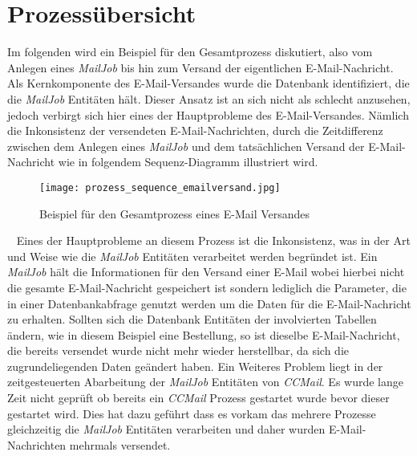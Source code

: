 \section{Prozessübersicht}
Im folgenden wird ein Beispiel für den Gesamtprozess diskutiert, also vom Anlegen eines \emph{MailJob} bis hin zum Versand der eigentlichen E-Mail-Nachricht. Als Kernkomponente des E-Mail-Versandes wurde die Datenbank identifiziert, die die \emph{MailJob} Entitäten hält. Dieser Ansatz ist an sich nicht als schlecht anzusehen, jedoch verbirgt sich hier eines der Hauptprobleme des E-Mail-Versandes. Nämlich die Inkonsistenz der versendeten E-Mail-Nachrichten, durch die Zeitdifferenz zwischen dem Anlegen eines \emph{MailJob} und dem tatsächlichen Versand der E-Mail-Nachricht wie in folgendem Sequenz-Diagramm illustriert wird.
\begin{figure}[h]
\centering
\texttt{[image: prozess\_sequence\_emailversand.jpg]}
\caption{Beispiel für den Gesamtprozess eines E-Mail Versandes}
\label{fig:sequence-diagram-mail-send}
\end{figure}
\ \newline
Eines der Hauptprobleme an diesem Prozess ist die Inkonsistenz, was in der Art und Weise wie die \emph{MailJob} Entitäten verarbeitet werden begründet ist. Ein \emph{MailJob} hält die Informationen für den Versand einer E-Mail wobei hierbei nicht die gesamte E-Mail-Nachricht gespeichert ist sondern lediglich die Parameter, die in einer Datenbankabfrage genutzt werden um die Daten für die E-Mail-Nachricht zu erhalten. Sollten sich die Datenbank Entitäten der involvierten Tabellen ändern, wie in diesem Beispiel eine Bestellung, so ist dieselbe E-Mail-Nachricht, die bereits versendet wurde nicht mehr wieder herstellbar, da sich die zugrundeliegenden Daten geändert haben.
\newline\newline
Ein Weiteres Problem liegt in der zeitgesteuerten Abarbeitung der \emph{MailJob} Entitäten von \emph{CCMail}. Es wurde lange Zeit nicht geprüft ob bereits ein \emph{CCMail} Prozess gestartet wurde bevor dieser gestartet wird. Dies hat dazu geführt dass es vorkam das mehrere Prozesse gleichzeitig die \emph{MailJob} Entitäten verarbeiten und daher wurden E-Mail-Nachrichten mehrmals versendet. 
